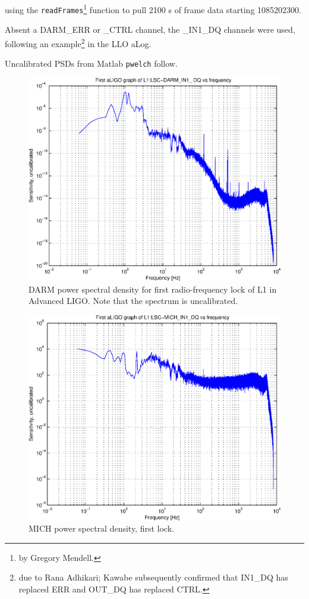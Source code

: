 using the \texttt{readFrames}\footnote{by Gregory Mendell.} function to pull 2100 s of frame data starting 1085202300.

Absent a DARM\_ERR or \_CTRL channel, the \_IN1\_DQ channels were used, following an example\footnote{due to Rana Adhikari; Kawabe subsequently confirmed that IN1\_DQ has replaced ERR and OUT\_DQ has replaced CTRL.}
in the LLO aLog.

Uncalibrated PSDs from Matlab \texttt{pwelch} follow.

\begin{figure}
\begin{center}
\includegraphics[width=0.4\paperwidth,height=0.3\paperheight]{aLIGOfirstLockSensitivity.eps}
\caption{
DARM power spectral density for first radio-frequency lock of L1 in Advanced LIGO. Note that the spectrum is uncalibrated.
}
\end{center}
\end{figure}
\begin{figure}
\begin{center}
\includegraphics[width=0.4\paperwidth,height=0.3\paperheight]{aLIGOfirstLockMICH.eps}
\caption{
MICH power spectral density, first lock.
}
\end{center}
\end{figure}
